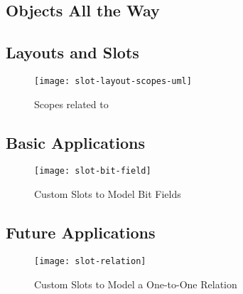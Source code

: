 \subsection{Objects All the Way}


\subsection{Layouts and Slots}

\begin{figure}[h]
	\centering
	\texttt{[image: slot-layout-scopes-uml]}
	\caption{Scopes related to }
\end{figure}

\subsection{Basic Applications}

\begin{figure}[h]
	\centering
	\texttt{[image: slot-bit-field]}
	\caption{Custom Slots to Model Bit Fields}
\end{figure}


\subsection{Future Applications}

\begin{figure}[h]
	\centering
	\texttt{[image: slot-relation]}
	\caption{Custom Slots to Model a One-to-One Relation}
\end{figure}

 \\
 \\


